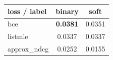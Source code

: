 \begin{tabular}{lcc}
\toprule
loss / label & binary & soft \\
\midrule
bce & \textbf{0.0381} & 0.0351 \\
listmle & 0.0337 & 0.0337 \\
approx_ndcg & 0.0252 & 0.0155 \\
\bottomrule
\end{tabular}